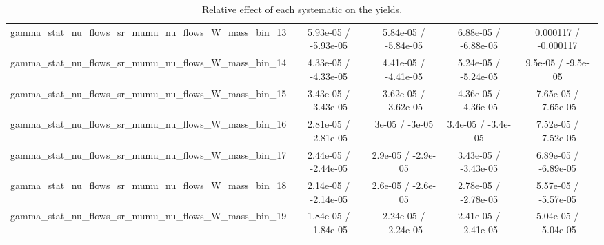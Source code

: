 \documentclass[10pt]{article}
\begin{document}
\begin{table}[htbp]
\begin{center}
\begin{tabular}{|c|c|c|c|c|}
  gamma_stat_nu_flows_sr_mumu_nu_flows_W_mass_bin_13 & 5.93e-05 / -5.93e-05 & 5.84e-05 / -5.84e-05 & 6.88e-05 / -6.88e-05 & 0.000117 / -0.000117 \\ 
  gamma_stat_nu_flows_sr_mumu_nu_flows_W_mass_bin_14 & 4.33e-05 / -4.33e-05 & 4.41e-05 / -4.41e-05 & 5.24e-05 / -5.24e-05 & 9.5e-05 / -9.5e-05 \\ 
  gamma_stat_nu_flows_sr_mumu_nu_flows_W_mass_bin_15 & 3.43e-05 / -3.43e-05 & 3.62e-05 / -3.62e-05 & 4.36e-05 / -4.36e-05 & 7.65e-05 / -7.65e-05 \\ 
  gamma_stat_nu_flows_sr_mumu_nu_flows_W_mass_bin_16 & 2.81e-05 / -2.81e-05 & 3e-05 / -3e-05 & 3.4e-05 / -3.4e-05 & 7.52e-05 / -7.52e-05 \\ 
  gamma_stat_nu_flows_sr_mumu_nu_flows_W_mass_bin_17 & 2.44e-05 / -2.44e-05 & 2.9e-05 / -2.9e-05 & 3.43e-05 / -3.43e-05 & 6.89e-05 / -6.89e-05 \\ 
  gamma_stat_nu_flows_sr_mumu_nu_flows_W_mass_bin_18 & 2.14e-05 / -2.14e-05 & 2.6e-05 / -2.6e-05 & 2.78e-05 / -2.78e-05 & 5.57e-05 / -5.57e-05 \\ 
  gamma_stat_nu_flows_sr_mumu_nu_flows_W_mass_bin_19 & 1.84e-05 / -1.84e-05 & 2.24e-05 / -2.24e-05 & 2.41e-05 / -2.41e-05 & 5.04e-05 / -5.04e-05 \\ 
\hline 
\end{tabular} 
\caption{Relative effect of each systematic on the yields.} 
\end{center} 
\end{table} 
\end{document}
